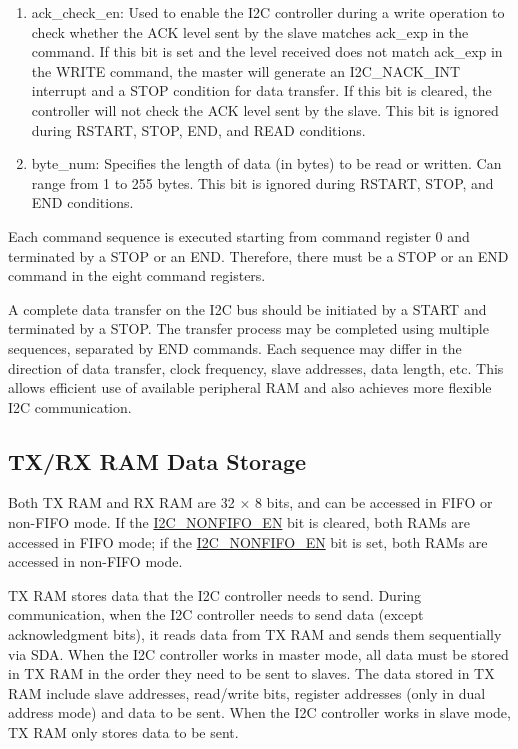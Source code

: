 \documentclass[main\_\_EN.tex]{subfiles}
\begin{document}
\begin{enumerate}
\item ack\_check\_en: Used to enable the I2C controller during a write operation to check whether the ACK level sent by the slave matches ack\_exp in the command. If this bit is set and the level received does not match ack\_exp in the WRITE command, the master will generate an I2C\_NACK\_INT interrupt and a STOP condition for data transfer. If this bit is cleared, the controller will not check the ACK level sent by the slave. This bit is ignored during RSTART, STOP, END, and READ conditions.

\item byte\_num: Specifies the length of data (in bytes) to be read or written. Can range from 1 to 255 bytes. This bit is ignored during RSTART, STOP, and END conditions.

\end{enumerate}

Each command sequence is executed starting from command register 0 and terminated by a STOP or an END. Therefore, there must be a STOP or an END command in the eight command registers.

A complete data transfer on the I2C bus should be initiated by a START and terminated by a STOP. The transfer process may be completed using multiple sequences, separated by END commands. Each sequence may differ in the direction of data transfer, clock frequency, slave addresses, data length, etc. This allows efficient use of available peripheral RAM and also achieves more flexible I2C communication.

\subsection{TX/RX RAM Data Storage}\label{subsubsec:i2c-txrx}
Both TX RAM and RX RAM are 32 × 8 bits, and can be accessed in FIFO or non-FIFO mode. If the \hyperref[fielddesc:I2CNONFIFOEN]{I2C\_NONFIFO\_EN} bit is cleared, both RAMs are accessed in FIFO mode; if the \hyperref[fielddesc:I2CNONFIFOEN]{I2C\_NONFIFO\_EN} bit is set, both RAMs are accessed in non-FIFO mode.

TX RAM stores data that the I2C controller needs to send. During communication, when the I2C controller needs to send data (except acknowledgment bits), it reads data from TX RAM and sends them sequentially via SDA. When the I2C controller works in master mode, all data must be stored in TX RAM in the order they need to be sent to slaves. The data stored in TX RAM include slave addresses, read/write bits, register addresses (only in dual address mode) and data to be sent. When the I2C controller works in slave mode, TX RAM only stores data to be sent.
\end{document}
